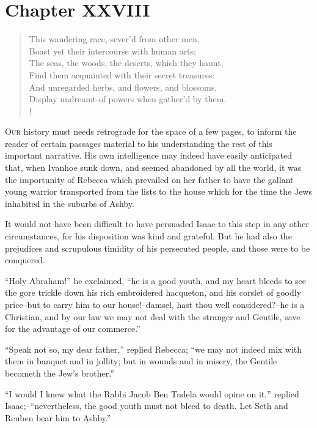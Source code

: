 \chapter{Chapter XXVIII}

\begin{verse}
This wandering race, sever'd from other men,\\
Boast yet their intercourse with human arts;\\
The seas, the woods, the deserts, which they haunt,\\
Find them acquainted with their secret treasures:\\
And unregarded herbs, and flowers, and blossoms,\\
Display undreamt-of powers when gather'd by them.\\!
\end{verse}

\lettrine{O}{ur} history must needs retrograde for the space of a
few pages, to
inform the reader of certain passages material to his understanding the
rest of this important narrative. His own intelligence may indeed have
easily anticipated that, when Ivanhoe sunk down, and seemed abandoned by
all the world, it was the importunity of Rebecca which prevailed on her
father to have the gallant young warrior transported from the lists to
the house which for the time the Jews inhabited in the suburbs of Ashby.

It would not have been difficult to have persuaded Isaac to this step in
any other circumstances, for his disposition was kind and grateful. But
he had also the prejudices and scrupulous timidity of his persecuted
people, and those were to be conquered.

``Holy Abraham!'' he exclaimed, ``he is a good youth, and my heart
bleeds to see the gore trickle down his rich embroidered hacqueton, and
his corslet of goodly price--but to carry him to our house!--damsel,
hast thou well considered?--he is a Christian, and by our law we may not
deal with the stranger and Gentile, save for the advantage of our
commerce.''

``Speak not so, my dear father,'' replied Rebecca; ``we may not indeed
mix with them in banquet and in jollity; but in wounds and in misery,
the Gentile becometh the Jew's brother.''

``I would I knew what the Rabbi Jacob Ben Tudela would opine on it,''
replied Isaac;--``nevertheless, the good youth must not bleed to death.
Let Seth and Reuben bear him to Ashby.''

